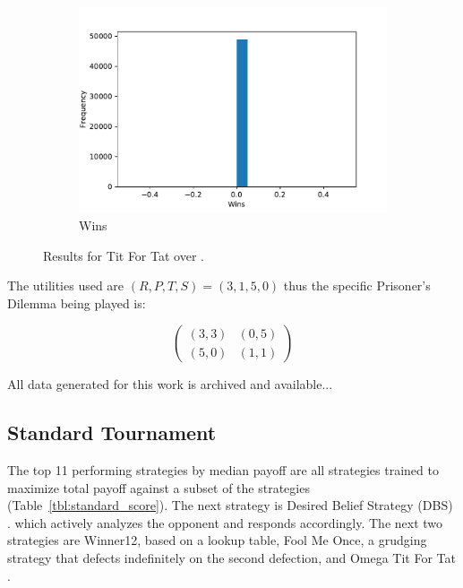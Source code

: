 \documentclass{article}
\begin{document}
\begin{figure}[!hbtp]
\begin{subfigure}[t]{.3\textwidth}
        \includegraphics[width=\textwidth]{./assets/standard_tft_wins.pdf}
        \caption{Wins}
        \label{fig:tit_for_tat_wins}
    \end{subfigure}%

    \caption{Results for Tit For Tat over
        \protecttournaments.}
\end{figure}

The utilities used are \((R, P, T, S)=(3, 1, 5, 0)\) thus the specific
Prisoner's Dilemma being played is:

\begin{equation}\label{equ:pd}
    \begin{pmatrix}
        (3, 3) & (0, 5)\\
        (5, 0) & (1, 1)
    \end{pmatrix}
\end{equation}

All data generated for this work is archived and available...

\subsection{Standard Tournament}\label{sec:standard}

The top 11 performing strategies by median payoff are all strategies trained to maximize
total payoff against a subset of the strategies (Table~\ref{tbl:standard_score}).
The next strategy is Desired Belief Strategy (DBS) \cite{Au2006}.
which actively analyzes the opponent and responds
accordingly. The next two strategies are Winner12, based on a lookup table,
Fool Me Once, a grudging strategy that defects indefinitely on
the second defection, and Omega Tit For Tat \cite{kendall2007iterated}.
\end{document}
